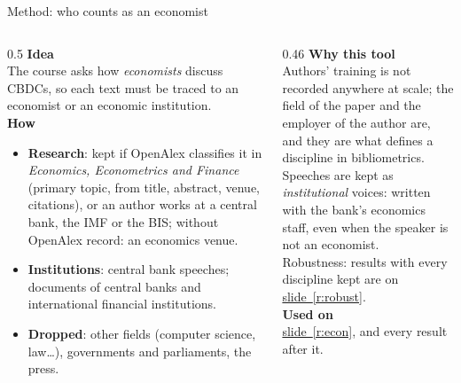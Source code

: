 \documentclass[aspectratio=169,10pt]{beamer}
\newcommand{\usedon}[1]{\hyperref[#1]{\textcolor{c4}{slide~\ref*{#1}}}}
\newcommand{\mhead}[1]{\textcolor{c1}{\textbf{#1}}\\[1pt]}
\begin{document}
\begin{frame}{Method: who counts as an economist}
\begin{columns}[T]
\begin{column}{0.5\textwidth}\footnotesize
\mhead{Idea}
The course asks how \emph{economists} discuss CBDCs, so each text must be traced to an economist or an economic institution.\\[4pt]
\mhead{How}
\begin{itemize}\setlength\itemsep{1pt}
\item \textbf{Research}: kept if OpenAlex classifies it in \emph{Economics, Econometrics and Finance} (primary topic, from title, abstract, venue, citations), or an author works at a central bank, the IMF or the BIS; without OpenAlex record: an economics venue.
\item \textbf{Institutions}: central bank speeches; documents of central banks and international financial institutions.
\item \textbf{Dropped}: other fields (computer science, law\dots), governments and parliaments, the press.
\end{itemize}
\end{column}
\begin{column}{0.46\textwidth}\footnotesize
\mhead{Why this tool}
Authors' training is not recorded anywhere at scale; the field of the paper and the employer of the author are, and they are what defines a discipline in bibliometrics.\\[4pt]
Speeches are kept as \emph{institutional} voices: written with the bank's economics staff, even when the speaker is not an economist.\\[4pt]
Robustness: results with every discipline kept are on \usedon{r:robust}.\\[6pt]
\mhead{Used on}
\usedon{r:econ}, and every result after it.
\end{column}
\end{columns}
\end{frame}
\end{document}
